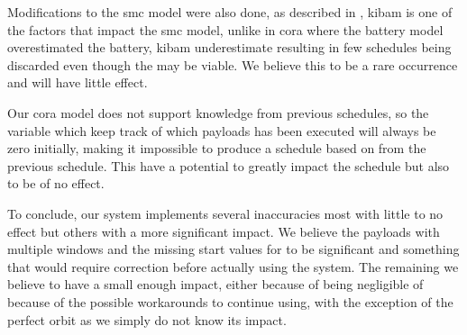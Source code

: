 Modifications to the \gls{smc} model were also done, as described in , \gls{kibam} is one of the factors that impact the \gls{smc} model, unlike in \gls{cora} where the battery model overestimated the battery, \gls{kibam} underestimate resulting in few schedules being discarded even though the may be viable. We believe this to be a rare occurrence and will have little effect. 

Our \gls{cora} model does not support knowledge from previous schedules, so the variable  which keep track of which payloads has been executed will always be zero initially, making it impossible to produce a schedule based on  from the previous schedule. This have a potential to greatly impact the schedule but also to be of no effect. 

To conclude, our system implements several inaccuracies most with little to no effect but others with a more significant impact. We believe the payloads with multiple windows and the missing start values for  to be significant and something that would require correction before actually using the system. The remaining we believe to have a small enough impact, either because of being negligible of because of the possible workarounds to continue using, with the exception of the perfect orbit as we simply do not know its impact.





